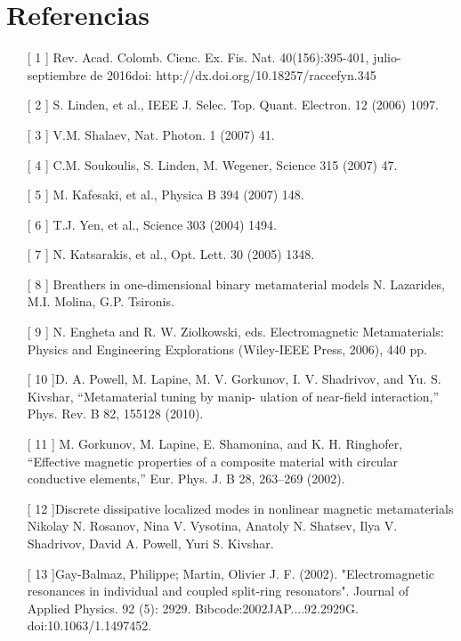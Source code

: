 \documentclass[11pt,letterpaper,twocolumn]{article}
\begin{document}
\section*{Referencias} 
\begin{itemize} 
\item[[ 1]] Rev. Acad. Colomb. Cienc. Ex. Fis. Nat. 40(156):395-401, julio-septiembre de 2016doi: http://dx.doi.org/10.18257/raccefyn.345

\item[[ 2]] S. Linden, et al., IEEE J. Selec. Top. Quant. Electron. 12 (2006) 1097.
\item[[ 3]] V.M. Shalaev, Nat. Photon. 1 (2007) 41.
\item[[ 4]] C.M. Soukoulis, S. Linden, M. Wegener, Science 315 (2007) 47.
\item[[ 5]] M. Kafesaki, et al., Physica B 394 (2007) 148.
\item[[ 6]] T.J. Yen, et al., Science 303 (2004) 1494.
\item[[ 7]] N. Katsarakis, et al., Opt. Lett. 30 (2005) 1348.
\item[[ 8]] Breathers in one-dimensional binary metamaterial models N. Lazarides, M.I. Molina, G.P. Tsironis. 
\item[[ 9]] N. Engheta and R. W. Ziolkowski, eds. Electromagnetic Metamaterials: Physics and Engineering Explorations
(Wiley-IEEE Press, 2006), 440 pp.
\item[[ 10]]D. A. Powell, M. Lapine, M. V. Gorkunov, I. V. Shadrivov, and Yu. S. Kivshar, “Metamaterial tuning by manip-
ulation of near-field interaction,” Phys. Rev. B 82, 155128 (2010).
\item[[ 11]]  M. Gorkunov, M. Lapine, E. Shamonina, and K. H. Ringhofer, “Effective magnetic properties of a composite
material with circular conductive elements,” Eur. Phys. J. B 28, 263–269 (2002).
\item[[ 12]]Discrete dissipative localized modes in nonlinear magnetic metamaterials Nikolay N. Rosanov, Nina V. Vysotina, Anatoly N. Shatsev, Ilya V. Shadrivov, David A. Powell, Yuri S. Kivshar.
\item[[ 13]]Gay-Balmaz, Philippe; Martin, Olivier J. F. (2002). "Electromagnetic resonances in individual and coupled split-ring resonators". Journal of Applied Physics. 92 (5): 2929. Bibcode:2002JAP....92.2929G. doi:10.1063/1.1497452.


\end{itemize}
\end{document}
